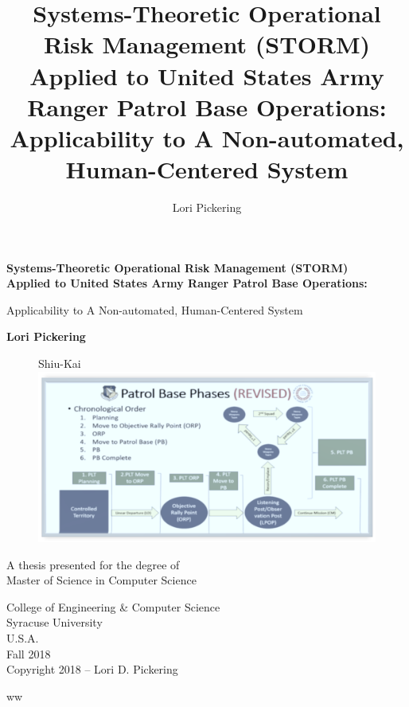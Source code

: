 \documentclass[hidelinks,12pt,a4paper]{report}
\begin{document}
\lstset{language=ML, basicstyle=\scriptsize}
\title{Systems-Theoretic Operational Risk Management (STORM) \\Applied to United States Army Ranger Patrol Base Operations: \\Applicability to A Non-automated, Human-Centered System}
\author{Lori Pickering}

\begin{titlepage}
\begin{center}
        \vspace*{1cm}
        
        \textbf{Systems-Theoretic Operational Risk Management (STORM) \\
                   Applied to United States Army Ranger Patrol Base Operations: \\
                   }
        
        \vspace{0.5cm}
        Applicability to A Non-automated, Human-Centered System
        
        \vspace{1.5cm}
        
        \textbf{Lori Pickering}
 \begin{figure}[t]Shiu-Kai
\includegraphics[width=\textwidth]{../figures/pbtoplevel2}
\end{figure}
       
        \vfill
        
        A thesis presented for the degree of\\
        Master of Science in Computer Science
        
        \vspace{0.8cm}
        
        
        College of Engineering \& Computer Science\\
        Syracuse University\\
        U.S.A.\\
        Fall 2018\\
       \textcopyright  Copyright 2018 -- Lori D. Pickering
    \end{center}

ww

\end{titlepage}
\cleardoublepage
\end{document}
